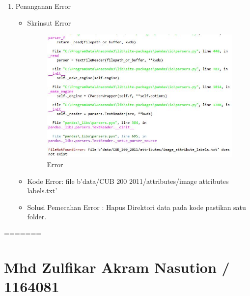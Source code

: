 \begin{enumerate}
\item Penanganan Error
\begin{itemize}
\item Skrinsut Error
\par
\begin{figure}[ht]
\centering
\includegraphics[scale=0.7]{figures/Error.jpg}
\caption{Error}
\label{contoh}
\end{figure}
\end{itemize}
\par
\begin{itemize}
\item Kode Error: file b'data/CUB 200 2011/attributes/image attributes labels.txt'
\par 
\item Solusi Pemecahan Error : Hapus Direktori data pada kode pastikan satu folder.
\par 
\par
\end{itemize}
\end{enumerate}

=======
\section {Mhd Zulfikar Akram Nasution / 1164081}
